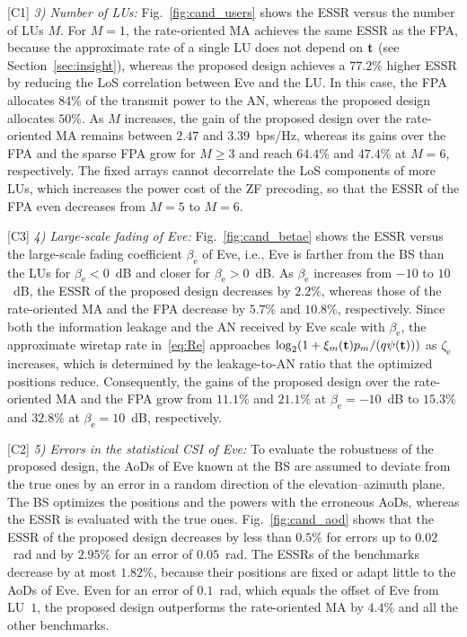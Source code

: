 \documentclass[journal]{IEEEtran}
\newcommand{\cand}[1]{{\color{blue}#1}}
\begin{document}
\cand{[C1] \textit{3) Number of LUs:} Fig.~\ref{fig:cand_users} shows the ESSR versus the number of LUs $M$. For $M=1$, the rate-oriented MA achieves the same ESSR as the FPA, because the approximate rate of a single LU does not depend on $\mathbf{t}$ (see Section~\ref{sec:insight}), whereas the proposed design achieves a $77.2\%$ higher ESSR by reducing the LoS correlation between Eve and the LU. In this case, the FPA allocates $84\%$ of the transmit power to the AN, whereas the proposed design allocates $50\%$. As $M$ increases, the gain of the proposed design over the rate-oriented MA remains between $2.47$ and $3.39$~bps/Hz, whereas its gains over the FPA and the sparse FPA grow for $M\ge3$ and reach $64.4\%$ and $47.4\%$ at $M=6$, respectively. The fixed arrays cannot decorrelate the LoS components of more LUs, which increases the power cost of the ZF precoding, so that the ESSR of the FPA even decreases from $M=5$ to $M=6$.}

\cand{[C3] \textit{4) Large-scale fading of Eve:} Fig.~\ref{fig:cand_betae} shows the ESSR versus the large-scale fading coefficient $\beta_{\mathrm e}$ of Eve, i.e., Eve is farther from the BS than the LUs for $\beta_{\mathrm e}<0$~dB and closer for $\beta_{\mathrm e}>0$~dB. As $\beta_{\mathrm e}$ increases from $-10$ to $10$~dB, the ESSR of the proposed design decreases by $2.2\%$, whereas those of the rate-oriented MA and the FPA decrease by $5.7\%$ and $10.8\%$, respectively. Since both the information leakage and the AN received by Eve scale with $\beta_{\mathrm e}$, the approximate wiretap rate in~\eqref{eq:Re} approaches $\log_2(1+\xi_m(\mathbf{t})p_m/(q\psi(\mathbf{t})))$ as $\zeta_{\mathrm e}$ increases, which is determined by the leakage-to-AN ratio that the optimized positions reduce. Consequently, the gains of the proposed design over the rate-oriented MA and the FPA grow from $11.1\%$ and $21.1\%$ at $\beta_{\mathrm e}=-10$~dB to $15.3\%$ and $32.8\%$ at $\beta_{\mathrm e}=10$~dB, respectively.}

\cand{[C2] \textit{5) Errors in the statistical CSI of Eve:} To evaluate the robustness of the proposed design, the AoDs of Eve known at the BS are assumed to deviate from the true ones by an error in a random direction of the elevation--azimuth plane. The BS optimizes the positions and the powers with the erroneous AoDs, whereas the ESSR is evaluated with the true ones. Fig.~\ref{fig:cand_aod} shows that the ESSR of the proposed design decreases by less than $0.5\%$ for errors up to $0.02$~rad and by $2.95\%$ for an error of $0.05$~rad. The ESSRs of the benchmarks decrease by at most $1.82\%$, because their positions are fixed or adapt little to the AoDs of Eve. Even for an error of $0.1$~rad, which equals the offset of Eve from LU~$1$, the proposed design outperforms the rate-oriented MA by $4.4\%$ and all the other benchmarks.}
\end{document}
